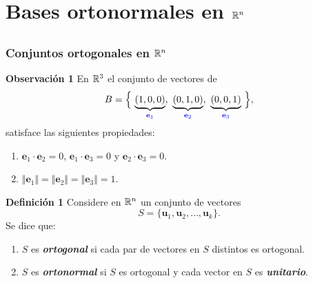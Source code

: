 \section{Bases ortonormales en $\mathbb{R}^n$}

\subsection{}

{\nologo
\begin{frame}\frametitle{Conjuntos ortogonales en $\mathbb{R}^n$}

\vspace{-2mm}
\begin{alertblock}{\textbf{Observación 1}}
	En $\mathbb{R}^3$ el conjunto de vectores de
	\[
	B = \Big\{ \, \underbrace{(1,0,0)}_{\color{blue}\mathbf{e}_1}, \ \underbrace{(0,1,0)}_{\color{blue}\mathbf{e}_2}, \ 
	\underbrace{(0,0,1)}_{\color{blue}\mathbf{e}_3} \, \Big\},
	\]
	satisface las siguientes propiedades:
	\begin{enumerate}
		\item[\labelname{$a$}] $\mathbf{e}_1\cdot \mathbf{e}_2 = 0$, $\mathbf{e}_1\cdot \mathbf{e}_3 = 0$ y $\mathbf{e}_2\cdot \mathbf{e}_3 = 0$.
		\item[\labelname{$b$}] $\Vert \mathbf{e}_1\Vert  = \Vert \mathbf{e}_2\Vert  = \Vert \mathbf{e}_3\Vert  = 1$.
	\end{enumerate}
\end{alertblock}

\vspace{-1mm}

\begin{defi}{\textbf{Definición 1}}\justifying
	Considere en $\mathbb{R}^n$ un conjunto de vectores
	\[
		S = \{ \mathbf{u}_1, \mathbf{u}_2, \hdots, \mathbf{u}_k\}.
	\]
	Se dice que:
	\begin{enumerate}
		\item[\labelname{$a$}] $S$ es  \textbf{\textit{ortogonal}} si cada par de vectores en $S$ distintos es ortogonal. %
		\item[\labelname{$b$}] $S$ es \textbf{\textit{ortonormal}} si $S$ es ortogonal y cada vector en $S$ es \textbf{\textit{unitario}}.
	\end{enumerate}
	
\end{defi}	


\end{frame}
}


